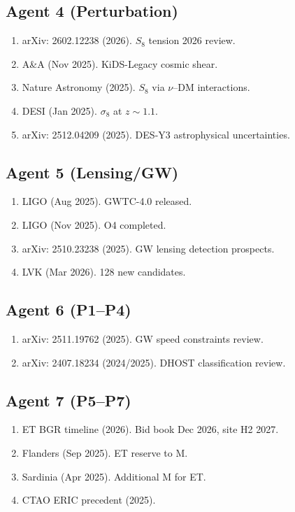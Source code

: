\documentclass[11pt,a4paper]{article}
\begin{document}
\subsection{Agent 4 (Perturbation)}
\begin{enumerate}
\item arXiv: 2602.12238 (2026). $S_8$ tension 2026 review.
\item A\&A (Nov 2025). KiDS-Legacy cosmic shear.
\item Nature Astronomy (2025). $S_8$ via $\nu$--DM interactions.
\item DESI (Jan 2025). $\sigma_8$ at $z \sim 1.1$.
\item arXiv: 2512.04209 (2025). DES-Y3 astrophysical uncertainties.
\end{enumerate}

\subsection{Agent 5 (Lensing/GW)}
\begin{enumerate}
\item LIGO (Aug 2025). GWTC-4.0 released.
\item LIGO (Nov 2025). O4 completed.
\item arXiv: 2510.23238 (2025). GW lensing detection prospects.
\item LVK (Mar 2026). 128 new candidates.
\end{enumerate}

\subsection{Agent 6 (P1--P4)}
\begin{enumerate}
\item arXiv: 2511.19762 (2025). GW speed constraints review.
\item arXiv: 2407.18234 (2024/2025). DHOST classification review.
\end{enumerate}

\subsection{Agent 7 (P5--P7)}
\begin{enumerate}
\item ET BGR timeline (2026). Bid book Dec 2026, site H2 2027.
\item Flanders (Sep 2025). ET reserve to M.
\item Sardinia (Apr 2025). Additional M for ET.
\item CTAO ERIC precedent (2025).
\end{enumerate}
\end{document}

